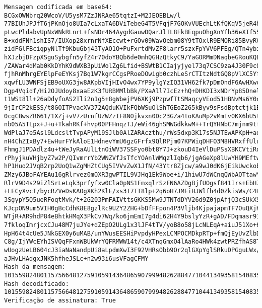 \documentclass[11pt]{article}
\begin{document}
    \begin{Verbatim}[commandchars=\\\{\}]
Mensagem codificada em base64: BCGxOWNbrq20WcoV/U5ysM7ZzJNRAe65tqtzI+M2JEOEBLw/l
77BIUhJPJfT6jPKnOjo8UIa7cLxaTA6DViTebeG4T5VFqjF7GOKvVUEchLtKfQKqV5jeR4hMIGUIl9IG
pLwcPldabvUpNxWNkRLnrL+fsNDr464AygdGauwDQarJlTL8FkBEqpuOhgXnYfh36eXIf55KdSilPApV
B+xddFNh1shIS7/IUXop28xrnrNfXEccwt+rGOv09WavOebm08Y9tTOxlR9EMORi85BvyRVD5e7r76z+
zidFGlFBciqpyNlTf9KbuGbj43TyAO1O+PuFxrtdMvZF8larr5szxFpYVV6PFEg/QTn4ybiS4TV2X+9I
hXJzbjDFzpXSguSybgfn5yfZ4r70doYBQb6de0mhQGHzQtkyC9/YaGORMmDNaqbeGRouKQL6PxQrMGO7
/ZAWar4dMab0KkDYhK9dWXB3pUiWolZg6Lfid+BSWtB1CIajyjyel73q7CSC9za4J30F9c0vbLXjgbEN
fjhRnMhrgEYElpFeEYKsj7Bq1W7kgrCCgsPRoeDOwigb0czhLeSrCTItzNdtGQ8pVlXC5Yfd6Lfsjkyl
xqwfLU3WNFSjEB9oUXG3jw8AKpbVIjHIvO4wx7YP9ylgYzIQ31VH62fk7pDmOndF6AwHXwc79lL0sM6g
Dgp4Vqidf/Hi2OJUdoy8xaaEzK3fURBMMlbBk/PXaAll7IcEz+hQ+DHKDI3xNDrYp85Dnelr9Vt7sele
t1WSt8ll+26aDdyfoAS2Tli2n1g5+8gWbejPV6XKj9PzpwfTtSMaqcyVEod51HBNvMs6Y0cniy6f/xIm
9jIrCP2kESS/t8GOITPvacXV372AQduKVIkFQbWSuOlShTGEoZ265kByv9sFsdBptctjk1BXI5EDYGRc
0cgCBwsZB661/1XZj+vV7zUrnfUZWZzIF8NOjkvxn0Dc23GZa4toKAuMp2vMmIv0KX6bU5twQt5MscN9
nb05A5TLpx+J+u+TkahRKf+hvp00PFHnqzTJ/eWi46ghSMWGdkkwM++TrQYHNbC7mjnm9tfmMSno3ibd
WdPlaJ7e5Asl9LdcsltTvpAPyM19SJlb0AlZARAczthu/rWs5dxp3K17s5NJTEwAPKpH+adfZBG7uSOc
nH4ChZIxBy7+EwHurFYkAloE1HdnevYmU6gzGFrfx9QlRPjm07KPWiqDHFO3M8HVRxffUluy4QEuwcC2
FhmgJ1PDAdlz4u+tWeJyRaAUlLtnOiWV37SSFyo0bt8Y7J+zkouD4IeVlDuPSsXBKCVtiRoyzvHpANeQ
rPhyjkuVHjbyZ7w2P/QIvmrrYb2WNZVfJsTfcYOAnlWMqzlIqb6/jgAGeXp8lUwYH9MEftwtKOxk5efB
hP1Huo2JVqB2rp2UoQ1wZgMHZtCUg5IVVvZwX1JfN/43Ytr8Zjcw/a9wJ0dK6jEikUwckobMB5RBH3Qw
ZMzy6JBoFAYEAu16gRlrvez0mOXR3gwPTIL9VJHq1Ek9Woe+i/1hiwU7dWCnqQWbAOTtawYpKLb7dJ3v
RlrV9D4s29iZlSrLeLqk3prfyfxw0Cla0pNS1FmxqlrSzFN6AZDgBjfUOgsf841Irs+EbH7XINLUNfrv
+LECyXvcT/bycRZVeDsKAOgXKh2KlE/xs3I7TT8lp+2q6oH7JMEiHJWlfh4d0ZkisWs/C4HQNoiWIBW0
3SgypY5Q5ueRFoqtMvk/t+2G203PmFAIVttsGKKS5Mw9JTNTdDYV26d9Z0jpAfjQ3cSUkXSI7zvCTIQ1
KJcpON9um5VIH0gBcCdhK8E8gzlRc9UZY2ZHG+bDfFFpon4P3Vljb4KjpajapmTF7OuQXjK50aYVU5Rp
WTjR+AR9hdP84eBhtkHMqX3PkCv7Wq/ko6jmEmI7g4di62H4Y9bslyYzR+gAD/FDqmasr9ISa9PAgclZ
7fkloqImrjcxCJu48M7juJYe+dZEpO2ULg1x3lJF4tTV/yoB8o58jLcNLEqA+aiuJ51Xo+6yj3c+7v+b
HpH64t4cUe5JNkGEX0y6uMAB/unYWusEESHiPvpdyHPexLCMPOCMDkpRTp+fmQjEyUvZlbD67Ai252VL
C8g/IjYWcEYhISVQqFFxnWBUkWrYQFRMWW14t/c4XTnqGmxO4lAaRo4HWk4zwtPRZfhAS8TCpGAaePPY
wUogzUeLB604cJ3iaNaNandpUi8aLpdmXwI3F92VHRsObb9Or2qlGXpYglSRkuDPGguLWx/2PY6mvIuw
aJHvLHAdgxJNK5hfheJSLc+n2w93i6usVFagCFMY
Hash da mensagem:
101559824801157566481275910591436486590799948262884771044134935815408357614456
Hash decodificado:
101559824801157566481275910591436486590799948262884771044134935815408357614456
Verificação de assinatura: True
    \end{Verbatim}
\end{document}
